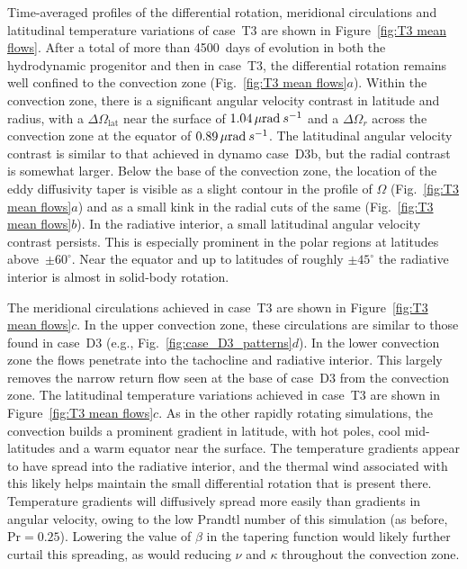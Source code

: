 Time-averaged profiles of the differential rotation, meridional
circulations and latitudinal temperature variations of case~T3 are shown in
Figure~\ref{fig:T3 mean flows}.  After a total of more than 4500~days of 
evolution in both the hydrodynamic progenitor and then in case~T3, the
differential rotation remains well confined to the convection zone
(Fig.~\ref{fig:T3 mean flows}$a$).
Within the convection zone, there is a significant angular velocity
contrast in latitude and radius, with a $\Delta \Omega_\mathrm{lat}$
near the surface of $1.04 \thinspace\mu \mathrm{rad}\: s^{-1}$ and
a $\Delta \Omega_r$ across the convection zone at the equator of
$0.89 \thinspace\mu \mathrm{rad}\: s^{-1}$.  The latitudinal angular
velocity contrast is similar to that achieved in dynamo case~D3b, but
the radial contrast is somewhat larger.  Below the base of the
convection zone, the location of the eddy diffusivity taper is visible
as a slight contour in the profile of $\Omega$ (Fig.~\ref{fig:T3 mean
 flows}$a$) and as a small kink in the radial cuts of the same
(Fig.~\ref{fig:T3 mean flows}$b$).  In the radiative interior, a small
latitudinal angular velocity contrast persists.  This is especially
prominent in the polar regions at latitudes above~$\pm60^\circ$.  Near
the equator and up to latitudes of roughly $\pm45^\circ$
the radiative interior is almost in solid-body rotation.

The meridional circulations achieved in case~T3
are shown in Figure~\ref{fig:T3 mean flows}$c$.  In the upper
convection zone, these circulations are similar to those found in
case~D3 (e.g., Fig.~\ref{fig:case_D3_patterns}$d$).  In the lower
convection zone the flows penetrate into the tachocline and radiative
interior.  This largely removes the narrow return flow seen at the
base of case~D3 from the convection zone.  The latitudinal temperature
variations achieved in case~T3 are shown in Figure~\ref{fig:T3 mean
  flows}$c$.  As in the other rapidly rotating simulations, the
convection builds a prominent gradient in latitude, with hot
poles, cool mid-latitudes and a warm equator near the surface.  The
temperature gradients appear to have spread into the radiative interior, and
the thermal wind associated with this likely helps maintain the small
differential rotation that is present there.  Temperature gradients
will diffusively spread more easily than gradients in angular
velocity, owing to the low Prandtl number of this simulation (as
before, $\mathrm{Pr}=0.25$). Lowering the value of $\beta$ in the
tapering function would likely further curtail this spreading, as
would reducing $\nu$ and $\kappa$ throughout the convection zone. 

